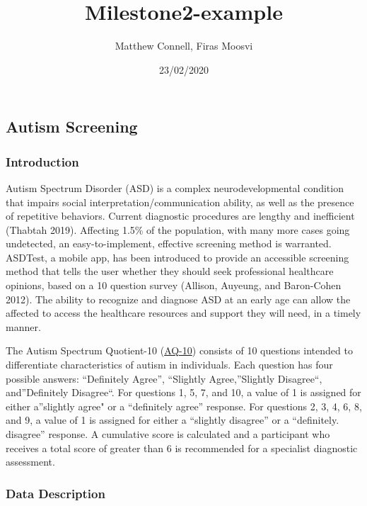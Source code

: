 \documentclass[]{article}
\title{Milestone2-example}
\author{Matthew Connell, Firas Moosvi}
\date{23/02/2020}
\begin{document}
\maketitle

\hypertarget{autism-screening}{%
\subsection{Autism Screening}\label{autism-screening}}

\hypertarget{introduction}{%
\subsubsection{Introduction}\label{introduction}}

Autism Spectrum Disorder (ASD) is a complex neurodevelopmental condition
that impairs social interpretation/communication ability, as well as the
presence of repetitive behaviors. Current diagnostic procedures are
lengthy and inefficient (Thabtah 2019). Affecting 1.5\% of the
population, with many more cases going undetected, an easy-to-implement,
effective screening method is warranted. ASDTest, a mobile app, has been
introduced to provide an accessible screening method that tells the user
whether they should seek professional healthcare opinions, based on a 10
question survey (Allison, Auyeung, and Baron-Cohen 2012). The ability to
recognize and diagnose ASD at an early age can allow the affected to
access the healthcare resources and support they will need, in a timely
manner.

The Autism Spectrum Quotient-10
(\href{https://www.nice.org.uk/guidance/cg142/resources/autism-spectrum-quotient-aq10-test-pdf-186582493}{AQ-10})
consists of 10 questions intended to differentiate characteristics of
autism in individuals. Each question has four possible answers:
``Definitely Agree'', ``Slightly Agree,''Slightly Disagree``,
and''Definitely Disagree``. For questions 1, 5, 7, and 10, a value of 1
is assigned for either a''slightly agree" or a ``definitely agree''
response. For questions 2, 3, 4, 6, 8, and 9, a value of 1 is assigned
for either a ``slightly disagree'' or a ``definitely. disagree''
response. A cumulative score is calculated and a participant who
receives a total score of greater than 6 is recommended for a specialist
diagnostic assessment.

\hypertarget{data-description}{%
\subsubsection{Data Description}\label{data-description}}
\end{document}
